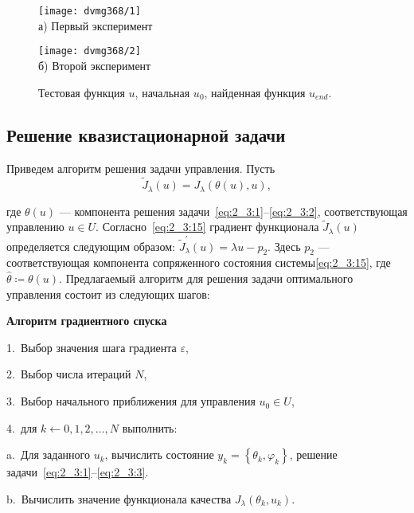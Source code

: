 \begin{figure}[ht]
    \begin{minipage}[b][][b]{0.49\linewidth}
        \centering
        \texttt{[image: dvmg368/1]} \\ а) Первый эксперимент
    \end{minipage}
    \hfill
    \begin{minipage}[b][][b]{0.49\linewidth}
        \centering
        \texttt{[image: dvmg368/2]} \\ б) Второй эксперимент
    \end{minipage}
    \caption{Тестовая функция $u$, начальная $u_0$, найденная функция $u_{end}.$}
    \label{fig:4_3:control}
\end{figure}

\subsection{Решение квазистационарной задачи}
\label{subsec:ch4/sec3/quasistationary}
Приведем алгоритм решения задачи управления.
Пусть
\[
    \widetilde{J}_{\lambda}(u)=J_{\lambda}(\theta(u), u),
\]

где $\theta(u)$ — компонента решения
задачи~\eqref{eq:2_3:1}--\eqref{eq:2_3:2},
соответствующая управлению $u \in U$.
Согласно~\eqref{eq:2_3:15} градиент функционала
$\widetilde{J}_{\lambda}(u)$ определяется
следующим образом: $\widetilde{J}_{\lambda}^{\prime}(u) = \lambda u-p_{2}$.
Здесь $p_{2}$ — соответствующая компонента сопряженного
состояния системы\eqref{eq:2_3:15}, где $\widehat{\theta}\coloneqq\theta(u)$.
Предлагаемый алгоритм для решения задачи оптимального управления
состоит из следующих шагов:

\textbf{Алгоритм градиентного спуска}

1.\ Выбор значения шага градиента $\varepsilon$,

2.\ Выбор числа итераций $N$,

3.\ Выбор начального приближения для управления $u_{0} \in U$,

4.\ для $k \leftarrow 0,1,2, \ldots, N$ выполнить:

\hspace{1cm} a.\ Для заданного $u_{k}$, вычислить состояние
$y_{k}=\left\{\theta_{k}, \varphi_{k}\right\}$, решение
задачи~\eqref{eq:2_3:1}--\eqref{eq:2_3:3}.

\hspace{1cm} b.\ Вычислить значение функционала качества
$J_{\lambda}\left(\theta_{k}, u_{k}\right)$.

